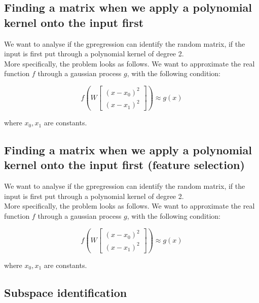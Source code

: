 \subsection{Finding a matrix when we apply a polynomial kernel onto the input first}
We want to analyse if the gpregression can identify the random matrix, if the input is first put through a polynomial kernel of degree 2. \\

More specifically, the problem looks as follows.
We want to approximate the real function $ f $ through a gaussian process $ g $, with the following condition:

\def\B{
\begin{bmatrix}
    (x - x_0)^2 \\
    (x - x_1)^2
\end{bmatrix}}

\begin{equation}
f \left( W \B \right) \approx g \left( x \right)
\end{equation} 

where $x_0, x_1$ are constants.

\subsection{Finding a matrix when we apply a polynomial kernel onto the input first (feature selection)}
We want to analyse if the gpregression can identify the random matrix, if the input is first put through a polynomial kernel of degree 2. \\

More specifically, the problem looks as follows.
We want to approximate the real function $ f $ through a gaussian process $ g $, with the following condition:

\def\B{
\begin{bmatrix}
    (x - x_0)^2 \\
    (x - x_1)^2
\end{bmatrix}}

\begin{equation}
f \left( W \B \right) \approx g \left( x \right)
\end{equation} 

where $x_0, x_1$ are constants.


\subsection{Subspace identification}


